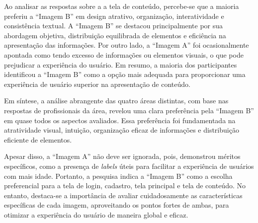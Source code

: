 \begin{itemize}
    Ao analisar as respostas sobre a a tela de conteúdo, percebe-se que a maioria preferiu a ``Imagem B'' em design atrativo, organização, interatividade e consistência textual. A ``Imagem B'' se destacou principalmente por sua abordagem objetiva, distribuição equilibrada de elementos e eficiência na apresentação das informações. Por outro lado, a ``Imagem A'' foi ocasionalmente apontada como tendo excesso de informações ou elementos visuais, o que pode prejudicar a experiência do usuário. Em resumo, a maioria dos participantes identificou a ``Imagem B'' como a opção mais adequada para proporcionar uma experiência de usuário superior na apresentação de conteúdo.
    
\end{itemize}

Em síntese, a análise abrangente das quatro áreas distintas, com base nas respostas de profissionais da área, revelou uma clara preferência pela ``Imagem B'' em quase todos os aspectos avaliados. Essa preferência foi fundamentada na atratividade visual, intuição, organização eficaz de informações e distribuição eficiente de elementos.

Apesar disso, a ``Imagem A'' não deve ser ignorada, pois, demonstrou méritos específicos, como a presença de \textit{labels} úteis para facilitar a experiência de usuários com mais idade. Portanto, a pesquisa indica a ``Imagem B'' como a escolha preferencial para a tela de login, cadastro, tela principal e tela de conteúdo. No entanto, destaca-se a importância de avaliar cuidadosamente as características específicas de cada imagem, aproveitando os pontos fortes de ambas, para otimizar a experiência do usuário de maneira global e eficaz.
